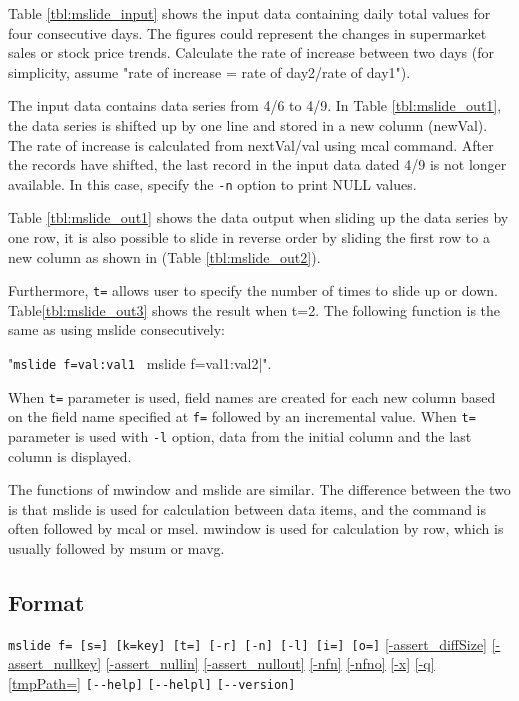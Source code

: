 Table \ref{tbl:mslide_input} shows the input data containing daily total values for four consecutive days. The figures could represent the changes in supermarket sales or stock price trends. 
Calculate the rate of increase between two days (for simplicity, assume "rate of increase =  rate of day2/rate of day1").

The input data contains data series from 4/6 to 4/9. In Table \ref{tbl:mslide_out1}, the data series is shifted up by one line and stored in a new column (newVal). The rate of increase is calculated from nextVal/val using mcal command. After the records have shifted, the last record in the input data dated 4/9 is not longer available. In this case, specify the \verb|-n| option to print NULL values.

Table \ref{tbl:mslide_out1} shows the data output when sliding up the data series by one row, it is also possible to slide in reverse order by sliding the first row to a new column as shown in (Table \ref{tbl:mslide_out2}).

Furthermore, \verb|t=| allows user to specify the number of times to slide up or down. Table\ref{tbl:mslide_out3} shows the result when t=2. The following function is the same as using mslide consecutively:
 
"\verb|mslide f=val:val1 | mslide f=val1:val2|". 

When \verb|t=| parameter is used, field names are created for each new column based on the field name specified at \verb|f=| followed by an incremental value. When \verb|t=| parameter is used with \verb|-l| option, data from the initial column and the last column is displayed. 

The functions of mwindow and mslide are similar. The difference between the two is that mslide is used for calculation between data items, and the command is often followed by mcal or msel.  mwindow is used for calculation by row, which is usually followed by msum or mavg. 

\subsection*{Format}
\verb|mslide f= [s=] [k=key] [t=] [-r] [-n] [-l] [i=] [o=]|
\hyperref[sect:option_assert_diffSize]{[-assert\_diffSize]}
\hyperref[sect:option_assert_nullkey]{[-assert\_nullkey]}
\hyperref[sect:option_assert_nullin]{[-assert\_nullin]}
\hyperref[sect:option_assert_nullout]{[-assert\_nullout]}
\hyperref[sect:option_nfn]{[-nfn]} 
\hyperref[sect:option_nfno]{[-nfno]}  
\hyperref[sect:option_x]{[-x]}
\hyperref[sect:option_q]{[-q]}
\hyperref[sect:option_option_tmppath]{[tmpPath=]}
\verb|[--help]|
\verb|[--helpl]|
\verb|[--version]|\\

